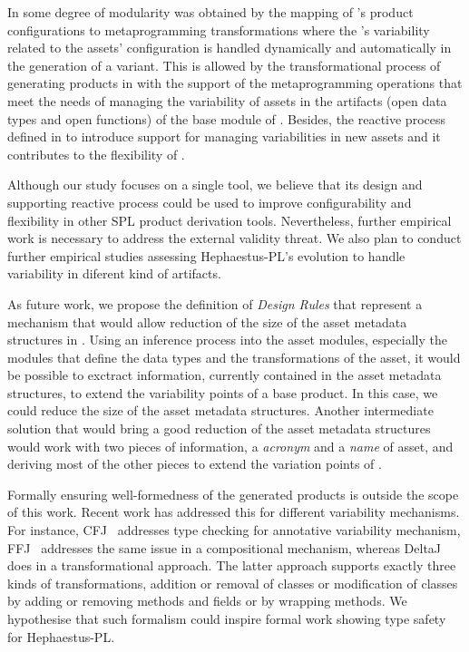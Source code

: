 In \hpl{} some degree of modularity was obtained by the mapping of \hpl's product configurations to metaprogramming transformations where the \hpl's variability related to the assets' configuration is handled dynamically and automatically in the generation of a \hpl{} variant. This is allowed by the transformational process of generating products in \hpl{} with the support of the metaprogramming operations that meet the needs of managing the variability of assets in the artifacts (open data types and open functions) of the base module of \hpl.
Besides, the reactive process defined in \hpl{} to introduce support for managing variabilities in new assets and it contributes to the flexibility of \hpl{}. 

Although our study focuses on a single tool, we believe that its design and supporting reactive process could be used to improve configurability and flexibility in other SPL product derivation tools.
Nevertheless, further empirical work is necessary to address the external validity threat. 
We also plan to conduct further empirical studies assessing Hephaestus-PL's evolution to handle variability in diferent kind of artifacts.

As future work, we propose the definition of \textit{Design Rules} that represent a mechanism that would allow reduction of the size of the asset metadata structures in \hpl. Using an inference process into the asset modules, especially the modules that define the data types and the transformations of the asset, it would be possible to exctract information, currently contained in the asset metadata structures, to extend the variability points of a \hpl{} base product. In this case, we could reduce the size of the asset metadata structures.  Another intermediate solution that would bring a good reduction of the asset metadata structures would work with two pieces of information, a \textit{acronym} and a \textit{name} of asset, and deriving most of the other pieces to extend the variation points of \hpl{}.

Formally ensuring well-formedness of the generated products is outside
the scope of this work. Recent work has addressed this for different
variability mechanisms.
For instance,  CFJ~\cite{kaestner-tosem12} addresses type checking
for annotative variability  mechanism,  FFJ~\cite{apel-ase08}
addresses the same issue in a compositional mechanism, whereas
DeltaJ~\cite{schaefer-aosd09} does in  a transformational approach.
The latter approach supports exactly three kinds of transformations,
addition or removal of classes or modification of  classes by adding
or removing methods and fields or by wrapping methods. We hypothesise
that such formalism could inspire formal work showing type safety for
Hephaestus-PL.
